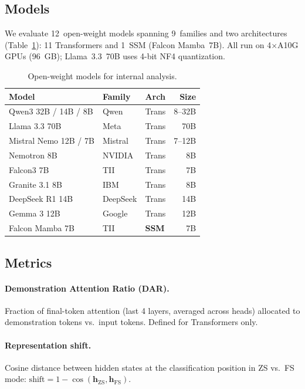 \documentclass[11pt,a4paper]{article}
\begin{document}
\subsection{Models}

We evaluate 12~open-weight models spanning 9~families and two architectures (Table~\ref{tab:internal_models}): 11 Transformers and 1~SSM (Falcon Mamba~7B). All run on 4$\times$A10G GPUs (96~GB); Llama~3.3~70B uses 4-bit NF4 quantization.

\begin{table}[t]
\centering
\small
\caption{Open-weight models for internal analysis.}
\label{tab:internal_models}
\begin{tabular}{lllr}
\toprule
\textbf{Model} & \textbf{Family} & \textbf{Arch} & \textbf{Size} \\
\midrule
Qwen3 32B / 14B / 8B   & Qwen      & Trans & 8--32B \\
Llama 3.3 70B           & Meta      & Trans & 70B \\
Mistral Nemo 12B / 7B   & Mistral   & Trans & 7--12B \\
Nemotron 8B             & NVIDIA    & Trans & 8B \\
Falcon3 7B              & TII       & Trans & 7B \\
Granite 3.1 8B          & IBM       & Trans & 8B \\
DeepSeek R1 14B         & DeepSeek  & Trans & 14B \\
Gemma 3 12B             & Google    & Trans & 12B \\
Falcon Mamba 7B         & TII       & \textbf{SSM} & 7B \\
\bottomrule
\end{tabular}
\end{table}

\subsection{Metrics}

\paragraph{Demonstration Attention Ratio (DAR).} Fraction of final-token attention (last 4 layers, averaged across heads) allocated to demonstration tokens vs.\ input tokens. Defined for Transformers only.

\paragraph{Representation shift.} Cosine distance between hidden states at the classification position in ZS vs.\ FS mode: $\text{shift} = 1 - \cos(\mathbf{h}_{\text{ZS}}, \mathbf{h}_{\text{FS}})$.
\end{document}
